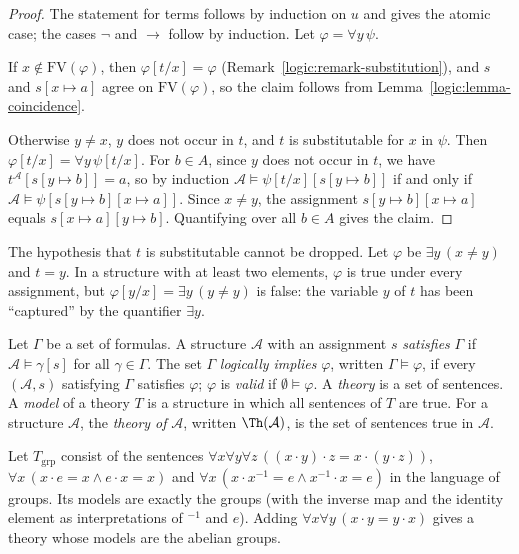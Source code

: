 \begin{proof}
The statement for terms follows by induction on $u$ and gives the atomic case;
the cases $\neg$ and $\to$ follow by induction. Let $\varphi = \forall y\,\psi$.

If $x \notin \mathrm{FV}(\varphi)$, then $\varphi[t/x] = \varphi$
(Remark~\ref{logic:remark-substitution}), and $s$ and $s[x \mapsto a]$ agree on
$\mathrm{FV}(\varphi)$, so the claim follows from
Lemma~\ref{logic:lemma-coincidence}.

Otherwise $y \neq x$, $y$ does not occur in $t$, and $t$ is substitutable for
$x$ in $\psi$. Then $\varphi[t/x] = \forall y\,\psi[t/x]$. For $b \in A$, since
$y$ does not occur in $t$, we have $t^{\mathcal{A}}[s[y \mapsto b]] = a$, so by
induction $\mathcal{A} \models \psi[t/x][s[y \mapsto b]]$ if and only if
$\mathcal{A} \models \psi[s[y \mapsto b][x \mapsto a]]$. Since $x \neq y$, the
assignment $s[y \mapsto b][x \mapsto a]$ equals $s[x \mapsto a][y \mapsto b]$.
Quantifying over all $b \in A$ gives the claim.
\end{proof}

\begin{counterexample}\label{logic:counterexample-capture}
The hypothesis that $t$ is substitutable cannot be dropped. Let $\varphi$ be
$\exists y\, (x \neq y)$ and $t = y$. In a structure with at least two
elements, $\varphi$ is true under every assignment, but
$\varphi[y/x] = \exists y\,(y \neq y)$ is false: the variable $y$ of $t$ has
been ``captured'' by the quantifier $\exists y$.
\end{counterexample}

\begin{definition}\label{logic:definition-model}
Let $\Gamma$ be a set of formulas. A structure $\mathcal{A}$ with an assignment
$s$ \emph{satisfies} $\Gamma$ if $\mathcal{A} \models \gamma[s]$ for all
$\gamma \in \Gamma$. The set $\Gamma$ \emph{logically implies} $\varphi$,
written $\Gamma \models \varphi$, if every $(\mathcal{A}, s)$ satisfying
$\Gamma$ satisfies $\varphi$; $\varphi$ is \emph{valid} if
$\emptyset \models \varphi$. A \emph{theory} is a set of sentences. A
\emph{model} of a theory $T$ is a structure in which all sentences of $T$ are
true. For a structure $\mathcal{A}$, the \emph{theory of} $\mathcal{A}$,
written $\Th(\mathcal{A})$, is the set of sentences true in $\mathcal{A}$.
\end{definition}

\begin{example}\label{logic:example-groups-models}
Let $T_{\mathrm{grp}}$ consist of the sentences
$\forall x \forall y \forall z\, ((x \cdot y) \cdot z = x \cdot (y \cdot z))$,
$\forall x\, (x \cdot e = x \wedge e \cdot x = x)$ and
$\forall x\, (x \cdot x^{-1} = e \wedge x^{-1} \cdot x = e)$ in the language of
groups. Its models are exactly the groups (with the inverse map and the
identity element as interpretations of ${}^{-1}$ and $e$). Adding
$\forall x \forall y\,(x \cdot y = y \cdot x)$ gives a theory whose models are
the abelian groups.
\end{example}

